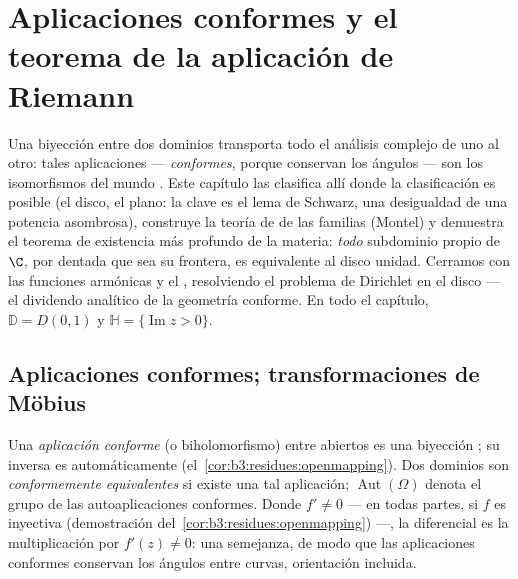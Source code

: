 \chapter{Aplicaciones conformes y el teorema de la aplicación de
Riemann}
\label{ch:b3:conformal}

Una biyección  entre dos
dominios transporta todo el análisis complejo de uno al otro: tales
aplicaciones --- \emph{conformes}, porque conservan los ángulos --- son
los isomorfismos del mundo .
Este capítulo las clasifica allí donde la clasificación es posible (el
disco, el plano: la clave es el lema de Schwarz, una desigualdad de una
potencia asombrosa), construye la teoría de  de las familias
 (Montel) y demuestra el
teorema de existencia más profundo de la materia: \emph{todo} subdominio
propio  de
$\C$, por dentada que sea su frontera, es
 equivalente al disco
unidad. Cerramos con las
funciones armónicas y el
, resolviendo el
problema de Dirichlet en el disco --- el dividendo analítico de la
geometría conforme. En todo el capítulo, $\mathbb D = D(0,1)$ y
$\mathbb H = \{\operatorname{Im}z >
0\}$.

\section{Aplicaciones conformes; transformaciones de Möbius}

\begin{definition}\label{def:b3:conformal:conformal}
Una \emph{aplicación conforme} (o
biholomorfismo) entre abiertos es una
biyección ; su inversa es
automáticamente 
(el~\cref{cor:b3:residues:openmapping}). Dos dominios son
\emph{conformemente equivalentes} si existe una tal aplicación;
$\operatorname{Aut}(\Omega)$ denota el grupo de las autoaplicaciones
conformes. Donde $f' \neq 0$ --- en todas partes, si $f$ es inyectiva
(demostración del~\cref{cor:b3:residues:openmapping}) ---, la
diferencial es la multiplicación por $f'(z) \neq 0$: una semejanza, de
modo que las aplicaciones conformes conservan los ángulos entre curvas,
orientación incluida.
\end{definition}

